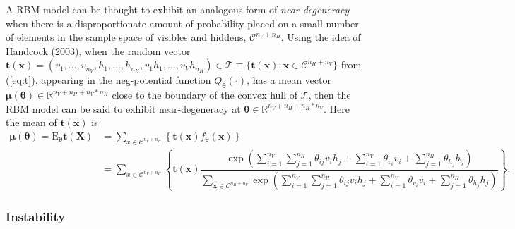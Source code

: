 \documentclass[12pt]{article}
\theoremstyle{definition}
\newcommand{\nv}{{n_{\scriptscriptstyle V}}}
\newcommand{\nh}{{n_{\scriptscriptstyle H}}}
\begin{document}
A RBM model can be thought to exhibit an analogous form of
\emph{near-degeneracy} when there is a disproportionate amount of
probability placed on a small number of elements in the sample space of
visibles and hiddens, \(\mathcal{C}^{\nv + \nh}\). Using the idea of
Handcock (\protect\hyperlink{ref-handcock2003assessing}{2003}), when the
random vector
\(\boldsymbol t(\boldsymbol x) = (v_1, \dots, v_\nv, h_1, \dots, h_\nh, v_1 h_1, \dots, v_V h_\nh ) \in \mathcal{T} \equiv \{\boldsymbol t(\boldsymbol x): \boldsymbol x \in \mathcal{C}^{\nh + \nv} \}\)
from (\eqref{eq:t}), appearing in the neg-potential function
\(Q_{\boldsymbol \theta}(\cdot)\), has a mean vector
\(\boldsymbol \mu(\boldsymbol \theta) \in \mathbb{R}^{\nv + \nh + \nv * \nh}\)
close to the boundary of the convex hull of \(\mathcal{T}\), then the
RBM model can be said to exhibit near-degeneracy at
\(\boldsymbol \theta \in \mathbb{R}^{\nv + \nh + \nh*\nv}\). Here the
mean of \(\boldsymbol t(\boldsymbol x)\) is
\begin{align*}
\boldsymbol \mu(\boldsymbol \theta) = \text{E}_{\boldsymbol \theta} \boldsymbol t(\boldsymbol X)  &= \sum\limits_{x \in \mathcal{C}^{\nv + \nh}} \left\{ \boldsymbol t(\boldsymbol x) f_{\boldsymbol \theta} (\boldsymbol x) \right\} \\
&= \sum\limits_{x \in \mathcal{C}^{\nv + \nh}} \left\{ \boldsymbol t(\boldsymbol x)\dfrac{\exp\left(\sum\limits_{i = 1}^\nv \sum\limits_{j=1}^\nh \theta_{ij} v_i h_j + \sum\limits_{i = 1}^\nv\theta_{v_i} v_i + \sum\limits_{j = 1}^\nh\theta_{h_j} h_j\right)}{\sum\limits_{\boldsymbol x \in \mathcal{C}^{\nh + \nv}}\exp\left(\sum\limits_{i = 1}^\nv \sum\limits_{j=1}^\nh \theta_{ij} v_i h_j + \sum\limits_{i = 1}^\nv\theta_{v_i} v_i + \sum\limits_{j = 1}^\nh\theta_{h_j} h_j\right)}\right\}.
\end{align*}
\subsubsection{Instability}\label{instability}
\end{document}
